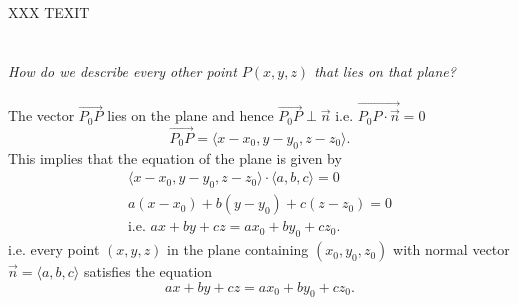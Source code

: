 \documentclass{report}
\begin{document}
\\
\\
\\
XXX TEXIT\\
\\
\\
  \textit{How do we describe every other point $P\left( x,y,z \right) $ that lies on that plane?} \\
\\
The vector $\vec{P_0P} $ lies on the plane and hence $\vec{P_0P} \perp \vec{n} $ i.e. $\vec{P_0P \cdot \vec{n} } =0$ 
\[
\vec{P_0P} = \langle x-x_0, y-y_0, z-z_0  \rangle 
.\] This implies that the equation of the plane is given by 
\begin{align*}
        \langle x-x_0,y-y_0,z-z_0  \rangle \cdot \langle a,b,c  \rangle =0\\
        a\left( x-x_0 \right) +b\left( y-y_0 \right) +c\left( z-z_0 \right) =0\\
        \text{i.e.  } ax+ by +cz = ax_0 + by_0 +cz_0
.\end{align*}
i.e. every point $ \left( x,y,z \right) $ in the plane containing $ \left( x_0 ,y_0 ,z_0 \right) $ with normal vector $ \vec{ n} = \langle a,b,c  \rangle $ satisfies the equation
\[
ax +by +cz = a x_0 +b y_0 +c z_0
.\] 

\end{document}
